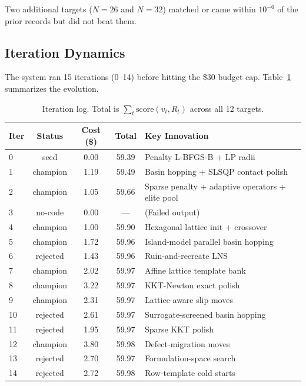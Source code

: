 \documentclass[11pt]{article}
\begin{document}
Two additional targets ($N=26$ and $N=32$) matched or came within $10^{-6}$ of the prior
records but did not beat them.

\subsection{Iteration Dynamics}

The system ran 15 iterations (0--14) before hitting the \$30 budget cap. Table~\ref{tab:iters}
summarizes the evolution.

\begin{table}[h]
\centering
\caption{Iteration log. Total is $\sum_t \text{score}(v_t, R_t)$ across all 12 targets.}
\label{tab:iters}
\begin{tabular}{@{}lcccl@{}}
\toprule
Iter & Status & Cost (\$) & Total & Key Innovation \\
\midrule
0  & seed      & 0.00  & 59.39 & Penalty L-BFGS-B + LP radii \\
1  & champion  & 1.19  & 59.49 & Basin hopping + SLSQP contact polish \\
2  & champion  & 1.05  & 59.66 & Sparse penalty + adaptive operators + elite pool \\
3  & no-code   & 0.00  & ---   & (Failed output) \\
4  & champion  & 1.00  & 59.90 & Hexagonal lattice init + crossover \\
5  & champion  & 1.72  & 59.96 & Island-model parallel basin hopping \\
6  & rejected  & 1.43  & 59.96 & Ruin-and-recreate LNS \\
7  & champion  & 2.02  & 59.97 & Affine lattice template bank \\
8  & champion  & 3.22  & 59.97 & KKT-Newton exact polish \\
9  & champion  & 2.31  & 59.97 & Lattice-aware slip moves \\
10 & rejected  & 2.61  & 59.97 & Surrogate-screened basin hopping \\
11 & rejected  & 1.95  & 59.97 & Sparse KKT polish \\
12 & champion  & 3.80  & 59.98 & Defect-migration moves \\
13 & rejected  & 2.70  & 59.97 & Formulation-space search \\
14 & rejected  & 2.72  & 59.98 & Row-template cold starts \\
\bottomrule
\end{tabular}
\end{table}
\end{document}
